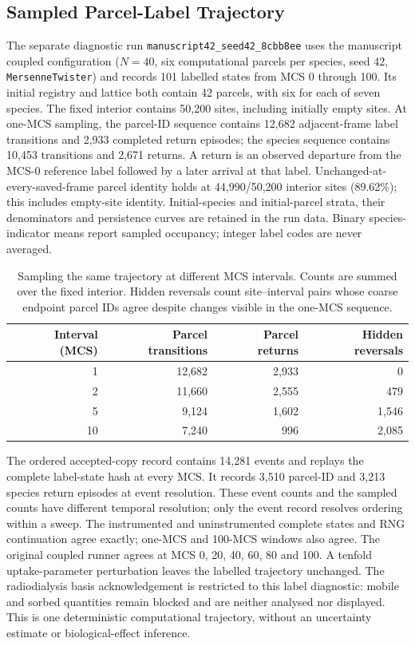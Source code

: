 \subsection{Sampled Parcel-Label Trajectory}\label{sec:label_trajectory}
The separate diagnostic run \texttt{manuscript42\_seed42\_8cbb8ee} uses the manuscript coupled
configuration ($N=40$, six computational parcels per species, seed 42,
             \texttt{MersenneTwister}) and records 101 labelled states from MCS 0 through 100.
Its initial registry and lattice both contain 42 parcels, with six for each of seven species.
The fixed interior contains 50,200 sites, including initially empty sites.
At one-MCS sampling, the parcel-ID sequence contains 12,682 adjacent-frame label transitions and 2,933 completed return episodes; the species sequence contains 10,453 transitions and 2,671 returns.
A return is an observed departure from the MCS-0 reference label followed by a later arrival at that label.
Unchanged-at-every-saved-frame parcel identity holds at 44,990/50,200 interior sites (89.62\%); this includes empty-site identity.
Initial-species and initial-parcel strata, their denominators and persistence curves are retained in the run data.
Binary species-indicator means report sampled occupancy; integer label codes are never averaged.

\begin{table}[htbp]
\centering\small
\caption{Sampling the same trajectory at different MCS intervals. Counts are summed over the fixed interior.
             Hidden reversals count site--interval pairs whose coarse endpoint parcel IDs agree despite changes visible in the one-MCS sequence.}
\label{tab:label_cadence}
\begin{tabular}{@{}rrrr@{}}\toprule
Interval (MCS) & Parcel transitions & Parcel returns & Hidden reversals \\\midrule
1 & 12,682 & 2,933 & 0 \\
2 & 11,660 & 2,555 & 479 \\
5 & 9,124 & 1,602 & 1,546 \\
10 & 7,240 & 996 & 2,085 \\
\bottomrule\end{tabular}\end{table}

The ordered accepted-copy record contains 14,281 events and replays the complete label-state hash at every MCS.
It records 3,510 parcel-ID and 3,213 species return episodes at event resolution.
These event counts and the sampled counts have different temporal resolution; only the event record resolves ordering within a sweep.
The instrumented and uninstrumented complete states and RNG continuation agree exactly; one-MCS and 100-MCS windows also agree.
The original coupled runner agrees at MCS 0, 20, 40, 60, 80 and 100. A tenfold uptake-parameter perturbation leaves the labelled trajectory unchanged.
The radiodialysis basis acknowledgement is restricted to this label diagnostic: mobile and sorbed quantities remain blocked and are neither analysed nor displayed.
This is one deterministic computational trajectory, without an uncertainty estimate or biological-effect inference.

